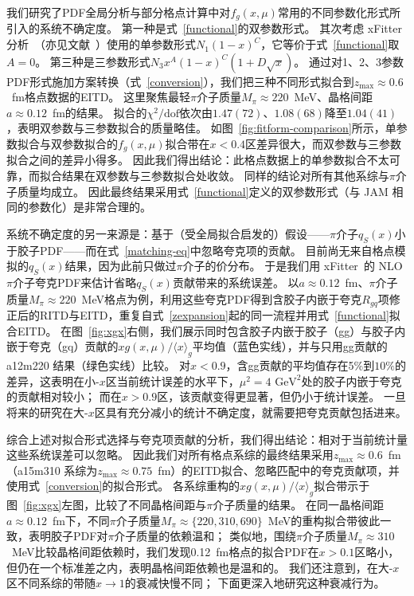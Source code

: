 我们研究了PDF全局分析与部分格点计算中对$f_g(x,\mu)$常用的不同参数化形式所引入的系统不确定度。
第一种是式~\ref{functional}的双参数形式。
其次考虑 xFitter 分析~\cite{Novikov:2020snp}（亦见文献~\cite{Aurenche:1989sx,Sutton:1991ay}）使用的单参数形式$N_1 (1-x)^C$，它等价于式~\ref{functional}取$A=0$。
第三种是三参数形式$N_3 x^A(1-x)^C(1+D\sqrt{x})$。
通过对1、2、3参数PDF形式施加方案转换（式~\ref{conversion}），我们把三种不同形式拟合到$z_\text{max}\approx 0.6$~fm格点数据的EITD。
这里聚焦最轻$\pi$介子质量$M_{\pi}\approx 220$~MeV、晶格间距$a\approx 0.12$~fm的结果。
拟合的$\chi^2/\text{dof}$依次由$1.47(72)$、$1.08(68)$降至$1.04(41)$，表明双参数与三参数拟合的质量略佳。
如图~\ref{fig:fitform-comparison}所示，单参数拟合与双参数拟合的$f_g(x,\mu)$拟合带在$x<0.4$区差异很大，而双参数与三参数拟合之间的差异小得多。
因此我们得出结论：此格点数据上的单参数拟合不太可靠，而拟合结果在双参数与三参数拟合处收敛。
同样的结论对所有其他系综与$\pi$介子质量均成立。
因此最终结果采用式~\ref{functional}定义的双参数形式（与 JAM 相同的参数化）是非常合理的。


系统不确定度的另一来源是：基于（受全局拟合启发的）假设——$\pi$介子$q_S(x)$小于胶子PDF——而在式~\ref{matching-eq}中忽略夸克项的贡献。
目前尚无来自格点模拟的$q_S(x)$结果，因为此前只做过$\pi$介子的价分布。
于是我们用 xFitter~\cite{Novikov:2020snp}的 NLO $\pi$介子夸克PDF来估计省略$q_S(x)$贡献带来的系统误差。
以$a\approx 0.12$~fm、$\pi$介子质量$M_\pi\approx 220$~MeV格点为例，利用这些夸克PDF得到含胶子内嵌于夸克$R_{gq}$项修正后的RITD与EITD，重复自式~\ref{zexpansion}起的同一流程并用式~\ref{functional}拟合EITD。
在图~\ref{fig:xgx}右侧，我们展示同时包含胶子内嵌于胶子（gg）与胶子内嵌于夸克（gq）贡献的$xg(x, \mu)/\langle x \rangle_g$平均值（蓝色实线），并与只用gg贡献的 a12m220 结果（绿色实线）比较。
对$x<0.9$，含gg贡献的平均值存在5\%到$10\%$的差异，这表明在小-$x$区当前统计误差的水平下，$\mu^2=4\text{ GeV}^2$处的胶子内嵌于夸克的贡献相对较小；
而在$x>0.9$区，该贡献变得更显著，但仍小于统计误差。
一旦将来的研究在大-$x$区具有充分减小的统计不确定度，就需要把夸克贡献包括进来。

综合上述对拟合形式选择与夸克项贡献的分析，我们得出结论：相对于当前统计量这些系统误差可以忽略。
因此我们对所有格点系综的最终结果采用$z_\text{max}\approx 0.6$~fm（a15m310 系综为$z_\text{max}\approx 0.75$~fm）的EITD拟合、忽略匹配中的夸克贡献项，并使用式~\ref{conversion}的拟合形式。
各系综重构的$xg(x, \mu)/\langle x \rangle_g$拟合带示于图~\ref{fig:xgx}左图，比较了不同晶格间距与$\pi$介子质量的结果。
在同一晶格间距$a\approx 0.12$~fm下，不同$\pi$介子质量$M_\pi\approx\{220,310,690\}$~MeV的重构拟合带彼此一致，表明胶子PDF对$\pi$介子质量的依赖温和；
类似地，围绕$\pi$介子质量$M_\pi\approx 310$~MeV比较晶格间距依赖时，我们发现0.12~fm格点的拟合PDF在$x>0.1$区略小，但仍在一个标准差之内，表明晶格间距依赖也是温和的。
我们还注意到，在大-$x$区不同系综的带随$x\to 1$的衰减快慢不同；
下面更深入地研究这种衰减行为。

